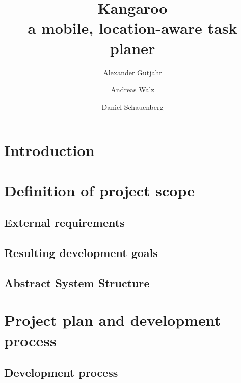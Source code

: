 \documentclass[11pt,a4paper]{scrreprt}
\begin{document}
\title{Kangaroo \\ a mobile, location-aware task planer}
\author{Alexander Gutjahr \and Andreas Walz \and
        Daniel Schauenberg}

\maketitle

\tableofcontents

\chapter{Introduction} %
\label{chp:introduction}


\chapter{Definition of project scope} %
	\section{External requirements} %
	\label{chp:requirements}
	
	
	\section{Resulting development goals} %
	\label{chp:dev_goals}
	
	
	\section{Abstract System Structure} %
	\label{chp:structure}
	
	
\chapter{Project plan and development process} %
\label{chp:project_plan}



	\section{Development process} %
	\label{chp:dev process}
	
	
\end{document}
